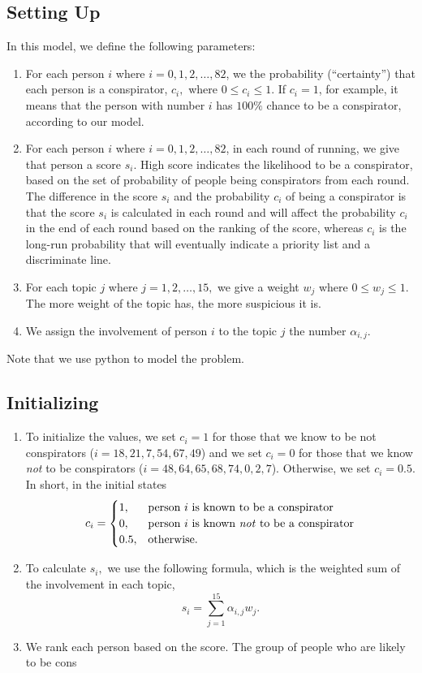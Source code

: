 \documentclass{icmmcm}
\begin{document}
\subsection{Setting Up}
In this model, we define the following parameters:
\begin{enumerate}
\item  For each person $i$ where $i=0,1,2,\ldots, 82$, 
we the probability (``certainty'')
that each person is a conspirator, $c_i,$
where $0\leq c_i \leq 1.$ 
If $c_i=1$, for example, it means that the person
with number $i$ has $100\%$ chance to be
a conspirator, according to our model. 

\item  For each person $i$ where $i=0,1,2,\ldots, 82$, in each round of running,
we give that person a score $s_i$. High score indicates
the likelihood to be a conspirator, based on the set
of probability of people being conspirators from each round.
The difference in the score $s_i$ and the probability $c_i$ of
being a conspirator is that the score $s_i$ is calculated in each round
and will affect the probability $c_i$ in the end of each round
based on the ranking of the score, whereas $c_i$ is the long-run
probability that will eventually indicate a priority list and
a discriminate line.

\item For each topic $j$ where $j=1,2,\ldots,15,$
we give a weight $w_j$ where $0\leq w_j\leq 1.$
The more weight of the topic has, the more suspicious it is.

\item  We assign the involvement of person $i$ to the topic $j$ the number
$\alpha_{i,j}.$
\end{enumerate}

Note that we use python to model the problem.

\subsection{Initializing}
\begin{enumerate}
\item To initialize the values, we set $c_i = 1$ for those that
we know to be not conspirators ($i=18,21,7,54,67,49$)
and we set $c_i = 0$ for those that
we know \textit{not} to be conspirators ($i=48,64,65,68,74,0,2,7$).
Otherwise, we set $c_i = 0.5.$ In short, in the initial states
\[c_i=
\begin{cases}
1,	& \text{person $i$ is known to be a conspirator}\\
0,	& \text{person $i$ is known \textit{not} to be a conspirator}\\
0.5,	&\text{otherwise.}
\end{cases}\]

\item To calculate $s_i,$ we use the following formula,
which is the weighted sum of the involvement in each topic,
\[s_i = \sum_{j=1}^{15} \alpha_{i,j} w_j.\]

\item We rank each person based on the score.
The group of people who are likely to be 
cons
\end{enumerate}
\end{document}
